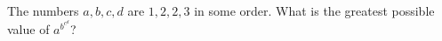 The numbers $a,b,c,d$ are $1,2,2,3$ in some order. What is the greatest possible value of $a^{b^{c^d}}$?
